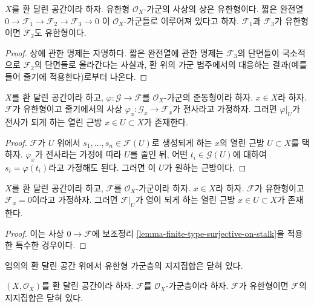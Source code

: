 \begin{lemma}
\label{lemma-extension-finite-type}
$X$를 환 달린 공간이라 하자.
유한형 $\mathcal{O}_X$-가군의 사상의 상은 유한형이다.
짧은 완전열
$0 \to \mathcal{F}_1 \to \mathcal{F}_2 \to \mathcal{F}_3 \to 0$
이 $\mathcal{O}_X$-가군들로 이루어져 있다고 하자.
$\mathcal{F}_1$과 $\mathcal{F}_3$가 유한형이면 $\mathcal{F}_2$도 유한형이다.
\end{lemma}

\begin{proof}
상에 관한 명제는 자명하다.
짧은 완전열에 관한 명제는 $\mathcal{F}_3$의 단면들이 국소적으로
$\mathcal{F}_2$의 단면들로 올라간다는 사실과, 환 위의 가군 범주에서의
대응하는 결과(예를 들어 줄기에 적용한다)로부터 나온다.
\end{proof}

\begin{lemma}
\label{lemma-finite-type-surjective-on-stalk}
$X$를 환 달린 공간이라 하고,
$\varphi : \mathcal{G} \to \mathcal{F}$를 $\mathcal{O}_X$-가군의 준동형이라 하자.
$x \in X$라 하자. $\mathcal{F}$가 유한형이고 줄기에서의 사상
$\varphi_x : \mathcal{G}_x \to \mathcal{F}_x$가 전사라고 가정하자.
그러면 $\varphi|_U$가 전사가 되게 하는 열린 근방
$x \in U \subset X$가 존재한다.
\end{lemma}

\begin{proof}
$\mathcal{F}$가 $U$ 위에서 $s_1, \ldots, s_n \in \mathcal{F}(U)$로 생성되게 하는
$x$의 열린 근방 $U \subset X$를 택하자.
$\varphi_x$가 전사라는 가정에 따라 $U$를 줄인 뒤,
어떤 $t_i \in \mathcal{G}(U)$에 대하여 $s_i = \varphi(t_i)$라고
가정해도 된다. 그러면 이 $U$가 원하는 근방이다.
\end{proof}

\begin{lemma}
\label{lemma-finite-type-stalk-zero}
$X$를 환 달린 공간이라 하고, $\mathcal{F}$를 $\mathcal{O}_X$-가군이라 하자.
$x \in X$라 하자. $\mathcal{F}$가 유한형이고 $\mathcal{F}_x = 0$이라고 가정하자.
그러면 $\mathcal{F}|_U$가 영이 되게 하는 열린 근방
$x \in U \subset X$가 존재한다.
\end{lemma}

\begin{proof}
이는 사상 $0 \to \mathcal{F}$에 보조정리
\ref{lemma-finite-type-surjective-on-stalk}을 적용한 특수한 경우이다.
\end{proof}

\begin{lemma}
\label{lemma-support-finite-type-closed}
\begin{slogan}
임의의 환 달린 공간 위에서 유한형 가군층의 지지집합은 닫혀 있다.
\end{slogan}
$(X, \mathcal{O}_X)$를 환 달린 공간이라 하자.
$\mathcal{F}$를 $\mathcal{O}_X$-가군층이라 하자.
$\mathcal{F}$가 유한형이면 $\mathcal{F}$의 지지집합은 닫혀 있다.
\end{lemma}

